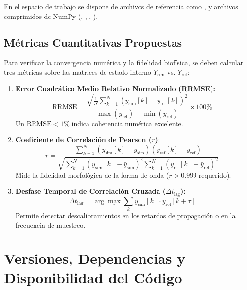 \documentclass[12pt,a4paper]{article}
\begin{document}
En el espacio de trabajo se dispone de archivos de referencia como ,  y archivos comprimidos de NumPy (, , , ).

\subsection{Métricas Cuantitativas Propuestas}
Para verificar la convergencia numérica y la fidelidad biofísica, se deben calcular tres métricas sobre las matrices de estado interno $Y_{\text{sim}}$ vs. $Y_{\text{ref}}$:

\begin{enumerate}
    \item \textbf{Error Cuadrático Medio Relativo Normalizado (RRMSE):}
    \begin{equation}
    \text{RRMSE} = \frac{\sqrt{\frac{1}{N} \sum_{k=1}^{N} \left( y_{\text{sim}}[k] - y_{\text{ref}}[k] \right)^2}}{\max(y_{\text{ref}}) - \min(y_{\text{ref}})} \times 100\%
    \end{equation}
    Un $\text{RRMSE} < 1\%$ indica coherencia numérica excelente.

    \item \textbf{Coeficiente de Correlación de Pearson ($r$):}
    \begin{equation}
    r = \frac{\sum_{k=1}^N (y_{\text{sim}}[k] - \bar{y}_{\text{sim}})(y_{\text{ref}}[k] - \bar{y}_{\text{ref}})}{\sqrt{\sum_{k=1}^N (y_{\text{sim}}[k] - \bar{y}_{\text{sim}})^2 \sum_{k=1}^N (y_{\text{ref}}[k] - \bar{y}_{\text{ref}})^2}}
    \end{equation}
    Mide la fidelidad morfológica de la forma de onda ($r > 0.999$ requerido).

    \item \textbf{Desfase Temporal de Correlación Cruzada ($\Delta t_{\text{lag}}$):}
    \begin{equation}
    \Delta t_{\text{lag}} = \arg\max_{\tau} \sum_{k} y_{\text{sim}}[k] \cdot y_{\text{ref}}[k + \tau]
    \end{equation}
    Permite detectar descalibramientos en los retardos de propagación o en la frecuencia de muestreo.
\end{enumerate}

\section{Versiones, Dependencias y Disponibilidad del Código}
\end{document}
